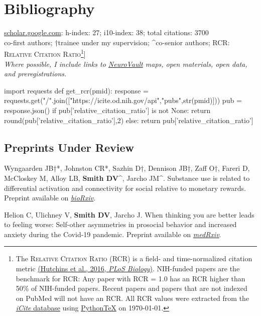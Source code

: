 \documentclass[11pt, letterpaper]{article}
\newcommand{\biorxiv}[1]{\href{#1}{\textit{bioRxiv}}}
\newcommand{\medrxiv}[1]{\href{#1}{\textit{medRxiv}}}
\newcommand{\pytex}{Python\TeX}
\begin{document}
\section*{Bibliography}
\aiGoogleScholar \hspace{.01cm} \href{https://scholar.google.com/citations?user=czV7OcQAAAAJ&hl=en}{scholar.google.com}: h-index: 27; i10-index: 38; total citations: 3700 \\ 
\lbrack*co-first authors; †trainee under my supervision; \^{}co-senior authors; RCR: \textsc{Relative Citation Ratio}\footnote{The \textsc{Relative Citation Ratio} (RCR) is a field- and time-normalized citation metric \href{http://journals.plos.org/plosbiology/article?id=10.1371/journal.pbio.1002541}{(Hutchins et al., 2016, \textit{PLoS Biology})}. NIH-funded papers are the benchmark for RCR: Any paper with RCR = 1.0 has an RCR higher than 50\% of NIH-funded papers. Recent papers and papers that are not indexed on PubMed will not have an RCR. All RCR values were extracted from the \href{https://icite.od.nih.gov/stats}{\textit{iCite} database} using \href{https://github.com/gpoore/pythontex}{\pytex} on \today.}] \\ 

\textit{Where possible, I include links to \href{https://neurovault.org}{NeuroVault} maps, open materials, open data, and preregistrations.}


\begin{pycode}
import requests
def get_rcr(pmid):
  response = requests.get("/".join(["https://icite.od.nih.gov/api","pubs",str(pmid)]))
  pub = response.json()
  if pub['relative_citation_ratio'] is not None:
    return round(pub['relative_citation_ratio'],2)
  else:
    return pub['relative_citation_ratio']
\end{pycode}


\subsection*{Preprints Under Review}

\begin{hangparas}{.5in}{1}

Wyngaarden JB†*, Johnston CR*, Sazhin D†, Dennison JB†, Zaff O†, Fareri D, McCloskey M, Alloy LB, \textbf{Smith DV}\^{}, Jarcho JM\^{}. Substance use is related to differential activation and connectivity for social relative to monetary rewards. Preprint available on \biorxiv{https://doi.org/10.1101/2023.01.17.524305}.

Helion C, Ulichney V, \textbf{Smith DV}, Jarcho J. When thinking you are better leads to feeling worse: Self-other asymmetries in prosocial behavior and increased anxiety during the Covid-19 pandemic. Preprint available on \medrxiv{https://doi.org/10.1101/2021.02.26.21252547}. \\ 



\end{hangparas}
\end{document}
